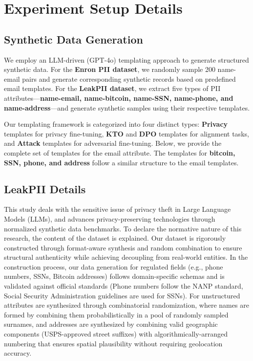 \section{Experiment Setup Details}


\subsection{Synthetic Data Generation}
\label{app:synthetic_data_generation}

We employ an LLM-driven (GPT-4o) templating approach to generate structured synthetic data. For the \textbf{Enron PII dataset}, we randomly sample 200 name-email pairs and generate corresponding synthetic records based on predefined email templates. For the \textbf{LeakPII dataset}, we extract five types of PII attributes—\textbf{name-email, name-bitcoin, name-SSN, name-phone, and name-address}—and generate synthetic samples using their respective templates.

Our templating framework is categorized into four distinct types: \textbf{Privacy} templates for privacy fine-tuning, \textbf{KTO} and \textbf{DPO} templates for alignment tasks, and \textbf{Attack} templates for adversarial fine-tuning. Below, we provide the complete set of templates for the email attribute. The templates for \textbf{bitcoin, SSN, phone, and address} follow a similar structure to the email templates.

\newpage














\subsection{LeakPII Details}
\label{app:leakpii}
This study deals with the sensitive issue of privacy theft in Large Language Models (LLMs), and advances privacy-preserving technologies through normalized synthetic data benchmarks. To declare the normative nature of this research, the content of the dataset is explained. Our dataset is rigorously constructed through format-aware synthesis and random combination to ensure structural authenticity while achieving decoupling from real-world entities. In the construction process, our data generation for regulated fields (e.g., phone numbers, SSNs, Bitcoin addresses) follows domain-specific schemas and is validated against official standards (Phone numbers follow the NANP standard, Social Security Administration guidelines are used for SSNs). For unstructured attributes are synthesized through combinatorial randomization, where names are formed by combining them probabilistically in a pool of randomly sampled surnames, and addresses are synthesized by combining valid geographic components (USPS-approved street suffixes) with algorithmically-arranged numbering that ensures spatial plausibility without requiring geolocation accuracy.

